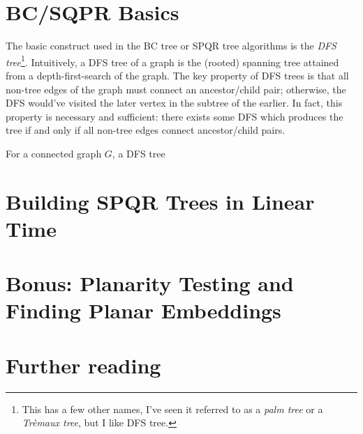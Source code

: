 \documentclass[letterpaper]{article}
\begin{document}
\section{BC/SQPR Basics}
\label{sec:basics}

The basic construct used in the BC tree or SPQR tree algorithms is the \emph{DFS
tree}\footnote{This has a few other names, I've seen it referred to as a
\emph{palm tree} or a \emph{Tr\`{e}maux tree}, but I like DFS tree.}.
Intuitively, a DFS tree of a graph is the (rooted) spanning tree attained from a
depth-first-search of the graph. The key property of DFS trees is that all
non-tree edges of the graph must connect an ancestor/child pair; otherwise, the
DFS would've visited the later vertex in the subtree of the earlier. In fact,
this property is necessary and sufficient: there exists some DFS which produces
the tree if and only if all non-tree edges connect ancestor/child pairs.

\begin{definition}
	For a connected graph $G$, a DFS tree
\end{definition}

\section{Building SPQR Trees in Linear Time}
\label{sec:algorithm}

\section{Bonus: Planarity Testing and Finding Planar Embeddings}
\label{sec:planarity}

\section{Further reading}

\end{document}
